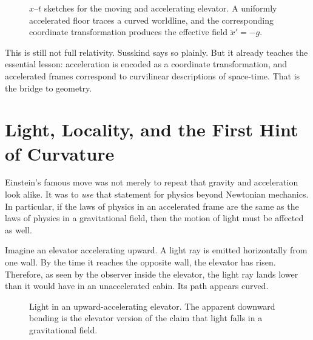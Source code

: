\begin{figure}[ht]
\centering
{}

\caption{$x$--$t$ sketches for the moving and accelerating elevator. A uniformly accelerated floor traces a curved worldline, and the corresponding coordinate transformation produces the effective field $\ddot x'=-g$.}
\end{figure}

This is still not full relativity. Susskind says so plainly. But it already teaches the essential lesson: acceleration is encoded as a coordinate transformation, and accelerated frames correspond to curvilinear descriptions of space-time. That is the bridge to geometry.

\section{Light, Locality, and the First Hint of Curvature}

Einstein's famous move was not merely to repeat that gravity and acceleration look alike. It was to \emph{use} that statement for physics beyond Newtonian mechanics. In particular, if the laws of physics in an accelerated frame are the same as the laws of physics in a gravitational field, then the motion of light must be affected as well.

Imagine an elevator accelerating upward. A light ray is emitted horizontally from one wall. By the time it reaches the opposite wall, the elevator has risen. Therefore, as seen by the observer inside the elevator, the light ray lands lower than it would have in an unaccelerated cabin. Its path appears curved.

\begin{figure}[ht]
\centering
{}
\caption{Light in an upward-accelerating elevator. The apparent downward bending is the elevator version of the claim that light falls in a gravitational field.}
\end{figure}

